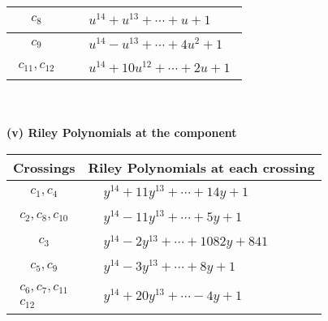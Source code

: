 \documentclass[1p]{elsarticle_modified}
\theoremstyle{definition}
\begin{document}
\begin{tabular}{m{50pt}|m{274pt}}
\hline $$\begin{aligned}c_{8}\end{aligned}$$&$\begin{aligned}
&u^{14}+u^{13}+\cdots+u+1
\end{aligned}$\\
\hline $$\begin{aligned}c_{9}\end{aligned}$$&$\begin{aligned}
&u^{14}- u^{13}+\cdots+4 u^2+1
\end{aligned}$\\
\hline $$\begin{aligned}c_{11},c_{12}\end{aligned}$$&$\begin{aligned}
&u^{14}+10 u^{12}+\cdots+2 u+1
\end{aligned}$\\
\hline
\end{tabular}\\~\\
\newpage\renewcommand{\arraystretch}{1}
\flushleft \textbf{(v) Riley Polynomials at the component}\newline \\
\begin{tabular}{m{50pt}|m{274pt}}
Crossings & \hspace{64pt}Riley Polynomials at each crossing \\
\hline $$\begin{aligned}c_{1},c_{4}\end{aligned}$$&$\begin{aligned}
&y^{14}+11 y^{13}+\cdots+14 y+1
\end{aligned}$\\
\hline $$\begin{aligned}c_{2},c_{8},c_{10}\end{aligned}$$&$\begin{aligned}
&y^{14}-11 y^{13}+\cdots+5 y+1
\end{aligned}$\\
\hline $$\begin{aligned}c_{3}\end{aligned}$$&$\begin{aligned}
&y^{14}-2 y^{13}+\cdots+1082 y+841
\end{aligned}$\\
\hline $$\begin{aligned}c_{5},c_{9}\end{aligned}$$&$\begin{aligned}
&y^{14}-3 y^{13}+\cdots+8 y+1
\end{aligned}$\\
\hline $$\begin{aligned}c_{6},c_{7},c_{11}\\c_{12}\end{aligned}$$&$\begin{aligned}
&y^{14}+20 y^{13}+\cdots-4 y+1
\end{aligned}$\\
\hline
\end{tabular}\\~\\
\end{document}
